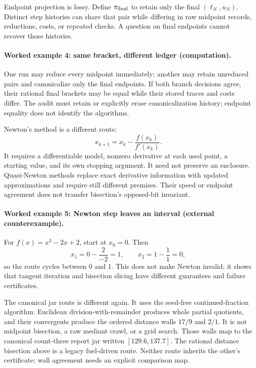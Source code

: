Endpoint projection is lossy.  Define \(\pi_{\rm final}\) to retain only the final \((\ell_N,u_N)\).  Distinct step
histories can share that pair while differing in raw midpoint records, reductions, costs, or repeated checks.  A
question on final endpoints cannot recover those histories.

\paragraph{Worked example 4: same bracket, different ledger (computation).}
One run may reduce every midpoint immediately; another may retain unreduced pairs and canonicalize only the final
endpoints.  If both branch decisions agree, their rational final brackets may be equal while their stored traces and
costs differ.  The audit must retain or explicitly erase canonicalization history; endpoint equality does not identify
the algorithms.

Newton's method is a different route:
\[
                         x_{k+1}=x_k-\frac{f(x_k)}{f'(x_k)}.
\]
It requires a differentiable model, nonzero derivative at each used point, a starting value, and its own stopping
argument.  It need not preserve an enclosure.  Quasi-Newton methods replace exact derivative information with updated
approximations and require still different premises.  Their speed or endpoint agreement does not transfer bisection's
opposed-bit invariant.

\paragraph{Worked example 5: Newton step leaves an interval (external counterexample).}
For \(f(x)=x^3-2x+2\), start at \(x_0=0\).  Then
\[
                         x_1=0-\frac{2}{-2}=1,\qquad
                         x_2=1-\frac{1}{1}=0,
\]
so the route cycles between \(0\) and \(1\).  This does not make Newton invalid; it shows that tangent iteration and
bisection slicing have different guarantees and failure certificates.

The canonical jar route is different again.  It uses the seed-free continued-fraction algorithm: Euclidean
division-with-remainder produces whole partial quotients, and their convergents produce the ordered distance walls
\(17/9\) and \(2/1\).  It is not midpoint bisection, a raw mediant crawl, or a grid search.  Those walls map to the
canonical count-three report jar written \([129.6,137.7]\).  The rational distance bisection above is a legacy
fuel-driven route.  Neither route inherits the other's certificate; wall agreement needs an explicit comparison map.

